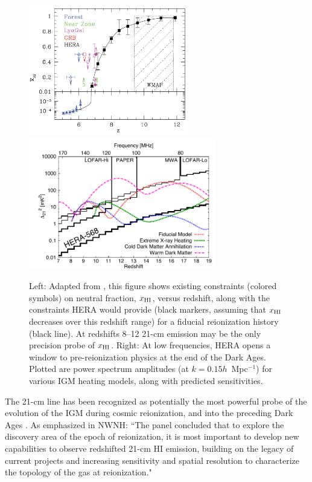 \documentclass[preprint]{aastex}
\def\HI{{H{\small I }}}
\def\xHI{{x_{\rm\HI}}}
\begin{document}
\begin{figure}[t]\centering
\includegraphics[height=2.25in]{plots/constraints.pdf}
\includegraphics[height=2.25in]{plots/Xray.pdf} 
\caption{\small 
Left: Adapted from \citet{robertson_2013}, this figure shows existing
constraints (colored symbols) on neutral fraction, $\xHI$, versus redshift, along with 
the constraints HERA would provide (black markers, assuming
that $\xHI$ decreases over this redshift range) for a fiducial
reionization history (black line).
At redshifts 8--12
21-cm emission may be the only precision probe of $\xHI$.
Right: At low frequencies, HERA opens a window to
pre-reionization physics at the end of the Dark Ages. Plotted are power spectrum amplitudes (at $k =
0.15h$~Mpc$^{-1}$) for various IGM heating models,
along with predicted sensitivities.
}\label{fig:x_i_Xray} \end{figure}

The 21-cm line has been recognized as potentially the most
powerful probe of the evolution of the IGM during cosmic 
reionization, and into
the preceding Dark Ages \citep{morales_wyithe2010,furlanetto_et_al2006}.
As emphasized in NWNH: ``The panel concluded that to explore the discovery
area of the epoch of reionization, it is most important to develop new
capabilities to observe redshifted 21-cm \HI emission, building on the legacy of
current projects and increasing sensitivity and spatial resolution to
characterize the topology of the gas at reionization."
\end{document}
